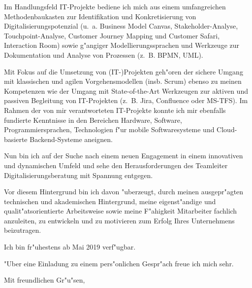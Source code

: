 \documentclass[10pt,a4paper]{dinbrief}
\begin{document}
\begin{letter}
Im Handlungsfeld IT-Projekte bediene ich mich aus einem umfangreichen Methodenbaukasten zur Identifikation und Konkretisierung von Digitalisierungspotenzial (u.~a. Business Model Canvas, Stakeholder-Analyse, Touchpoint-Analyse, Customer Journey Mapping und Customer Safari, Interaction Room) sowie g"angiger Modellierungssprachen und Werkzeuge zur Dokumentation und Analyse von Prozessen (z.~B. BPMN, UML).\clearpage

Mit Fokus auf die Umsetzung von (IT-)Projekten geh"oren der sichere Umgang mit klassischen und agilen Vorgehensmodellen (insb. Scrum) ebenso zu meinen Kompetenzen wie der Umgang mit State-of-the-Art Werkzeugen zur aktiven und passiven Begleitung von IT-Projekten (z.~B. Jira, Confluence oder MS-TFS). Im Rahmen der von mir verantworteten IT-Projekte konnte ich mir ebenfalls fundierte Kenntnisse in den Bereichen Hardware, Software, Programmiersprachen, Technologien f"ur mobile Softwaresysteme und Cloud-basierte Backend-Systeme aneignen.

Nun bin ich auf der Suche nach einem neuen Engagement in einem innovativen und dynamischen Umfeld und sehe den Herausforderungen des Teamleiter Digitalisierungsberatung mit Spannung entgegen.

Vor diesem Hintergrund bin ich davon "uberzeugt, durch meinen ausgepr"agten technischen und akademischen Hintergrund, meine eigenst"andige und qualit"atsorientierte Arbeitsweise sowie meine F"ahigkeit Mitarbeiter fachlich anzuleiten, zu entwickeln und zu motivieren zum Erfolg Ihres Unternehmens beizutragen.

Ich bin fr"uhestens ab Mai 2019 verf"ugbar. %

"Uber eine Einladung zu einem pers"onlichen Gespr"ach freue ich mich sehr.

\closing{Mit freundlichen Gr"u"sen,}
\end{letter}
\end{document}
